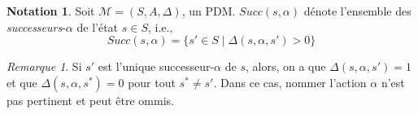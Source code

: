 \documentclass[12pt,a4paper]{report}
\theoremstyle{definition}%
\newtheorem*{notation}{Notation}
\theoremstyle{remark}
\newtheorem{remark}{Remarque}[chapter]
\begin{document}
\begin{notation}
	Soit $\mathcal{M} = (S, A, \Delta)$, un PDM.
		$Succ(s, \alpha)$ dénote l'ensemble des \textit{successeurs}-$\alpha$ de l'état $s
			\in S$, i.e.,
			\[ Succ(s, \alpha) = \{ s' \in S \; | \; \Delta(s, \alpha, s') > 0 \} \]
\end{notation}

\begin{remark}
	Si $s'$ est l'unique successeur-$\alpha$ de $s$, alors, on a que $\Delta(s, \alpha, s') = 1$
	et que $\Delta(s, \alpha, s^*) = 0$ pour tout $s^* \neq s'$.
	Dans ce cas, nommer l'action $\alpha$ n'est pas pertinent et peut être ommis.
\end{remark}
\end{document}
